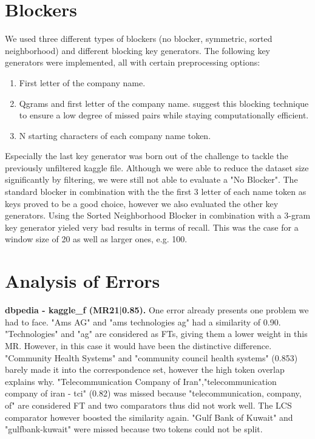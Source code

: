 \documentclass[11pt,titlepage,oneside,openany]{book}
\begin{document}
\begin{table}[]
\end{table}



\section{Blockers}
\label{sec:blockers}

We used three different types of blockers (no blocker, symmetric, sorted neighborhood) and different blocking key generators. The following key generators were implemented, all with certain preprocessing options: \begin{enumerate}
	\item First letter of the company name.
	\item Qgrams and first letter of the company name. \cite{gravano_approximate_nodate} suggest this blocking technique to ensure a low degree of missed pairs while staying computationally efficient.
	\item N starting characters of each company name token.
\end{enumerate}

Especially the last key generator was born out of the challenge to tackle the previously unfiltered kaggle file. Although we were able to reduce the dataset size significantly by filtering, we were still not able to evaluate a "No Blocker".
The standard blocker in combination with the the first 3 letter of each name token as keys proved to be a good choice, however we also evaluated the other key generators. Using the Sorted Neighborhood Blocker in combination with a 3-gram key generator yieled very bad results in terms of recall. This was the case for a window size of 20 as well as larger ones, e.g. 100.


\section{Analysis of Errors}
\label{sec:errors}
\textbf{dbpedia - kaggle\_f (MR21|0.85). } One error already presents one problem we had to face. "Ams AG" and "ams technologies ag" had a similarity of 0.90. "Technologies" and "ag" are considered as FTs, giving them a lower weight in this MR. However, in this case it would have been the distinctive difference. "Community Health Systems" and "community council health systems" (0.853) barely made it into the correspondence set, however the high token overlap explains why. "Telecommunication Company of Iran","telecommunication company of iran - tci" (0.82) was missed because "telecommunication, company, of" are considered FT and two comparators thus did not work well. The LCS comparator however boosted the similarity again. "Gulf Bank of Kuwait" and "gulfbank-kuwait" were missed because two tokens could not be split.
\end{document}
